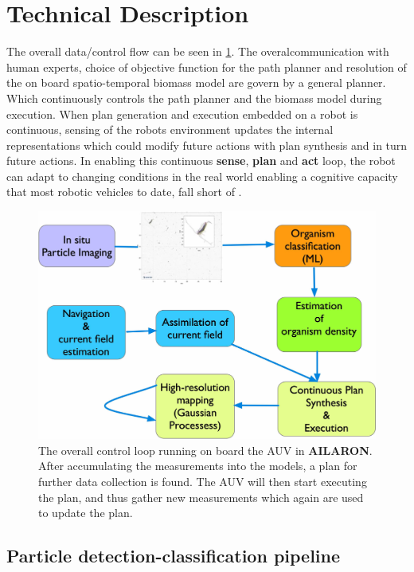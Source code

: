 \documentclass[conference]{IEEEtran}
\def\proje{{\textbf{AILARON}}}
\begin{document}
\section{Technical Description}

The overall data/control flow can be seen in
\cref{fig:sensePlanActLoop}. The overalcommunication with human experts, choice of objective function for the path planner and resolution of the on board spatio-temporal biomass model are govern by a general planner. Which continuously 
controls the path planner and the biomass model during execution. When plan generation and execution embedded on a robot is continuous, sensing of the robots environment
updates the internal representations which could modify future actions
with plan synthesis and in turn future actions.  In enabling this
continuous \textbf{sense}, \textbf{plan} and \textbf{act} loop, the
robot can adapt to changing conditions in the real world enabling a
cognitive capacity that most robotic vehicles to date, fall short of
\cite{rajan12}.

\begin{figure}[tbp]
\centerline{\includegraphics[width=0.8\linewidth]{figures/workflow-simplified.jpg}}
\caption{The overall control loop running on board the AUV in \proje. After accumulating the measurements into the models, a plan for further data collection is found. The AUV will then start executing the plan, and thus gather new measurements which again are used to update the plan.}
\label{fig:sensePlanActLoop}
\end{figure}

\subsection{Particle detection-classification pipeline}
\end{document}
